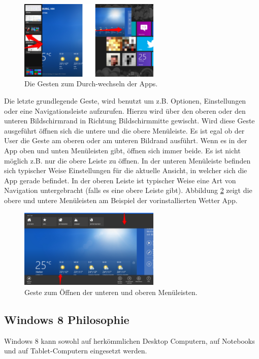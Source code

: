 \documentclass[12pt,a4paper,bibtotoc,abstracton]{scrartcl}
\begin{document}
\begin{figure}[h]	
	\centering
	\includegraphics[width=0.6\textwidth]{Bilder/Screenshots/windows8/apps_changing.png} 
	\caption{Die Gesten zum Durch-wechseln der Apps.}
	\label{fig:appschanging}
\end{figure}  

Die letzte grundlegende Geste, wird benutzt um z.B. Optionen, Einstellungen oder eine Navigationsleiste aufzurufen. Hierzu wird über den oberen oder den unteren Bildschirmrand in Richtung Bildschirmmitte gewischt. Wird diese Geste ausgeführt öffnen sich die untere und die obere Menüleiste. Es ist egal ob der User die Geste am oberen oder am unteren Bildrand ausführt. Wenn es in der App oben und unten Menüleisten gibt, öffnen sich immer beide. Es ist nicht möglich z.B. nur die obere Leiste zu öffnen. In der unteren Menüleiste befinden sich typischer Weise Einstellungen für die aktuelle Ansicht, in welcher sich die App gerade befindet. In der oberen Leiste ist typischer Weise eine Art von Navigation untergebracht (falls es eine obere Leiste gibt). Abbildung \ref{fig:menubar} zeigt die obere und untere Menüleisten am Beispiel der vorinstallierten Wetter App.

\begin{figure}[h]	
	\centering
	\includegraphics[width=0.6\textwidth]{Bilder/Screenshots/windows8/app_leisten.png} 
	\caption{Geste zum Öffnen der unteren und oberen Menüleisten.}
	\label{fig:menubar}
\end{figure}  

\subsection{Windows 8 Philosophie}
\label{subsec:win8philosophie}
Windows 8 kann sowohl auf herkömmlichen Desktop Computern, auf Notebooks und auf Tablet-Computern eingesetzt werden. 
\end{document}
